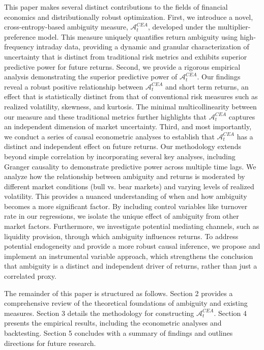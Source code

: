 \documentclass[preprint,12pt,authoryear]{elsarticle}
\begin{document}
This paper makes several distinct contributions to the fields of financial economics and distributionally robust optimization. First, we introduce a novel, cross-entropy-based ambiguity measure, $\mathcal{A}^{CEA}_t$, developed under the multiplier-preference model. This measure uniquely quantifies return ambiguity using high-frequency intraday data, providing a dynamic and granular characterization of uncertainty that is distinct from traditional risk metrics and exhibits superior predictive power for future returns. Second, we provide a rigorous empirical analysis demonstrating the superior predictive power of $\mathcal{A}^{CEA}_t$. Our findings reveal a robust positive relationship between $\mathcal{A}^{CEA}_t$ and short term returns, an effect that is statistically distinct from that of conventional risk measures such as realized volatility, skewness, and kurtosis. The minimal multicollinearity between our measure and these traditional metrics further highlights that $\mathcal{A}^{CEA}_t$ captures an independent dimension of market uncertainty. Third, and most importantly, we conduct a series of causal econometric analyses to establish that $\mathcal{A}^{CEA}_t$ has a distinct and independent effect on future returns. Our methodology extends beyond simple correlation by incorporating several key analyses, including Granger causality to demonstrate predictive power across multiple time lags. We analyze how the relationship between ambiguity and returns is moderated by different market conditions (bull vs. bear markets) and varying levels of realized volatility. This provides a nuanced understanding of when and how ambiguity becomes a more significant factor. By including control variables like turnover rate in our regressions, we isolate the unique effect of ambiguity from other market factors. Furthermore, we investigate potential mediating channels, such as liquidity provision, through which ambiguity influences returns. To address potential endogeneity and provide a more robust causal inference, we propose and implement an instrumental variable approach, which strengthens the conclusion that ambiguity is a distinct and independent driver of returns, rather than just a correlated proxy.

The remainder of this paper is structured as follows. Section 2 provides a comprehensive review of the theoretical foundations of ambiguity and existing measures. Section 3 details the methodology for constructing $\mathcal{A}^{CEA}_t$. Section 4 presents the empirical results, including the econometric analyses and backtesting. Section 5 concludes with a summary of findings and outlines directions for future research.
\end{document}

